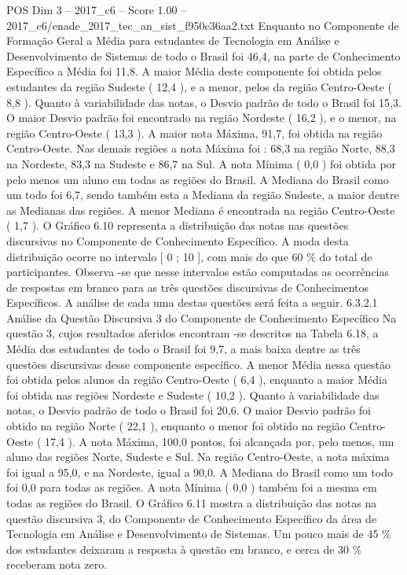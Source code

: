 \begin{textsample}{POS Dim 3 – 2017\_c6 – Score 1.00 – 2017\_c6/enade\_2017\_tec\_an\_sist\_f950c36aa2.txt}
Enquanto no Componente de Formação Geral a Média para estudantes de Tecnologia em Análise e Desenvolvimento de Sistemas de todo o Brasil foi 46,4, na parte de Conhecimento Específico a Média foi 11,8.
A maior Média deste componente foi obtida pelos estudantes da região Sudeste ( 12,4 ), e a menor, pelos da região Centro-Oeste ( 8,8 ).
Quanto à variabilidade das notas, o Desvio padrão de todo o Brasil foi 15,3.
O maior Desvio padrão foi encontrado na região Nordeste ( 16,2 ), e o menor, na região Centro-Oeste ( 13,3 ).
A maior nota Máxima, 91,7, foi obtida na região Centro-Oeste.
Nas demais regiões a nota Máxima foi : 68,3 na região Norte, 88,3 na Nordeste, 83,3 na Sudeste e 86,7 na Sul.
A nota Mínima ( 0,0 ) foi obtida por pelo menos um aluno em todas as regiões do Brasil.
A Mediana do Brasil como um todo foi 6,7, sendo também esta a Mediana da região Sudeste, a maior dentre as Medianas das regiões.
A menor Mediana é encontrada na região Centro-Oeste ( 1,7 ).
O Gráfico 6.10 representa a distribuição das notas nas questões discursivas no Componente de Conhecimento Específico.
A moda desta distribuição ocorre no intervalo [ 0 ; 10 ], com mais do que 60 \% do total de participantes.
Observa -se que nesse intervalos estão computadas as ocorrências de respostas em branco para as três questões discursivas de Conhecimentos Específicos.
A análise de cada uma destas questões será feita a seguir. 6.3.2.1 Análise da Questão Discursiva 3 do Componente de Conhecimento Específico Na questão 3, cujos resultados aferidos encontram -se descritos na Tabela 6.18, a Média dos estudantes de todo o Brasil foi 9,7, a mais baixa dentre as três questões discursivas desse componente específico.
A menor Média nessa questão foi obtida pelos alunos da região Centro-Oeste ( 6,4 ), enquanto a maior Média foi obtida nas regiões Nordeste e Sudeste ( 10,2 ).
Quanto à variabilidade das notas, o Desvio padrão de todo o Brasil foi 20,6.
O maior Desvio padrão foi obtido na região Norte ( 22,1 ), enquanto o menor foi obtido na região Centro-Oeste ( 17,4 ).
A nota Máxima, 100,0 pontos, foi alcançada por, pelo menos, um aluno das regiões Norte, Sudeste e Sul.
Na região Centro-Oeste, a nota máxima foi igual a 95,0, e na Nordeste, igual a 90,0.
A Mediana do Brasil como um todo foi 0,0 para todas as regiões.
A nota Mínima ( 0,0 ) também foi a mesma em todas as regiões do Brasil.
O Gráfico 6.11 mostra a distribuição das notas na questão discursiva 3, do Componente de Conhecimento Específico da área de Tecnologia em Análise e Desenvolvimento de Sistemas.
Um pouco mais de 45 \% dos estudantes deixaram a resposta à questão em branco, e cerca de 30 \% receberam nota zero.

\end{textsample}
